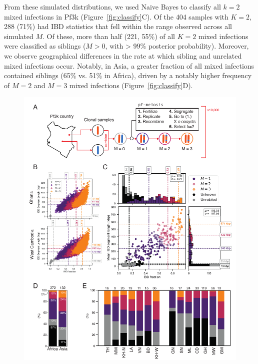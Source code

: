 \documentclass[9pt,lineno]{elife}
\begin{document}
From these simulated distributions, we used Naive Bayes to classify all $k=2$ mixed infections in Pf3k (Figure~\ref{fig:classify}C).  Of the 404 samples with $K = 2$, 288 (71\%) had IBD statistics that fell within the range observed across all simulated $M$. Of these, more than half (221, 55\%) of all $K=2$ mixed infections were classified as siblings ($M > 0$, with > 99\% posterior probability).  Moreover, we observe geographical differences in the rate at which sibling and unrelated mixed infections occur. Notably, in Asia, a greater fraction of all mixed infections contained siblings (65\% vs. 51\% in Africa), driven by a notably higher frequency of $M=2$ and $M=3$ mixed infections (Figure~\ref{fig:classify}D).

\begin{figure}[htp]
  \begin{center}
  \includegraphics[width=\textwidth]{Fig4-v3.pdf}

\end{center}
\end{figure}
\end{document}
